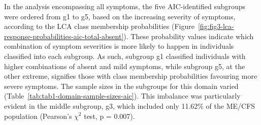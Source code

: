 In the analysis encompassing all symptoms, the five AIC-identified subgroups were ordered from g1 to g5, based on the increasing severity of symptoms, according to the LCA class membership probabilities (Figure~\ref{fig:fig3-lca-response-probabilities-aic-total-absent}).
These probability values indicate which combination of symptom severities is more likely to happen in individuals classified into each subgroup.
As such, subgroup g1 classified individuals with higher combinations of absent and mild symptoms, while subgroup g5, at the other extreme, signifies those with class membership probabilities favouring more severe symptoms.
The sample sizes in the subgroups for this domain varied (Table~\ref{tab:tab1-domain-sample-sizes-aic}).
This imbalance was particularly evident in the middle subgroup, g3, which included only 11.62\% of the ME/CFS population (Pearson's $\chi^2$ test, p = 0.007).

